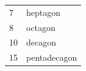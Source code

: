 {\begin{tabular}[t]{|l|l|}
        7 &
    
    
        heptagon%
     \tabularnewline\cline{1-1}\cline{2-2}
    
    
        8 &
    
    
        octagon%
     \tabularnewline\cline{1-1}\cline{2-2}
    
    
        10 &
    
    
        decagon%
     \tabularnewline\cline{1-1}\cline{2-2}
    
    
        15 &
    
    
        pentadecagon%
     \tabularnewline\cline{1-1}\cline{2-2}
    \end{tabular}} %

